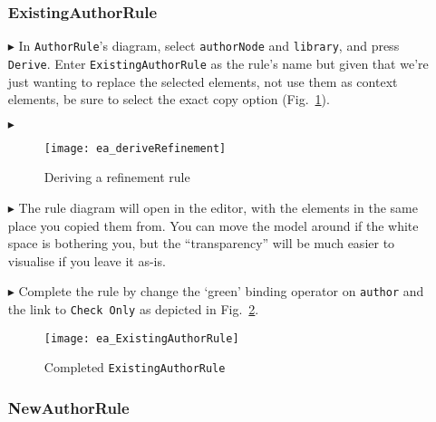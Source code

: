 \begin{itemize}

\subsubsection{ExistingAuthorRule} %

\item[$\blacktriangleright$] In \texttt{AuthorRule}'s diagram, select \texttt{authorNode} and \texttt{library}, and press \texttt{Derive}. Enter
\texttt{ExistingAuthorRule} as the rule's name but given that we're just wanting to replace the selected elements, not use them as context elements,
be sure to select the exact copy option (Fig.~\ref{ea:deriveRefinement}).

\item[$\blacktriangleright$]

\begin{figure}[htbp]
\begin{center}
  \texttt{[image: ea\_deriveRefinement]}
  \caption{Deriving a refinement rule}
  \label{ea:deriveRefinement}
\end{center}
\end{figure}

\item[$\blacktriangleright$] The rule diagram will open in the editor, with the elements in the same place you copied them from. You can move the model around
if the white space is bothering you, but the ``transparency'' will  be much easier to visualise if you leave it as-is.

\item[$\blacktriangleright$] Complete the rule by change the `green' binding operator on \texttt{author} and the link to \texttt{Check Only} as depicted in
Fig.~\ref{ea:existingAuthorRule}.

\begin{figure}[htbp]
\begin{center}
  \texttt{[image: ea\_ExistingAuthorRule]}
  \caption{Completed \texttt{ExistingAuthorRule}}
  \label{ea:existingAuthorRule}
\end{center}
\end{figure}

\subsubsection{NewAuthorRule} %


\end{itemize}
